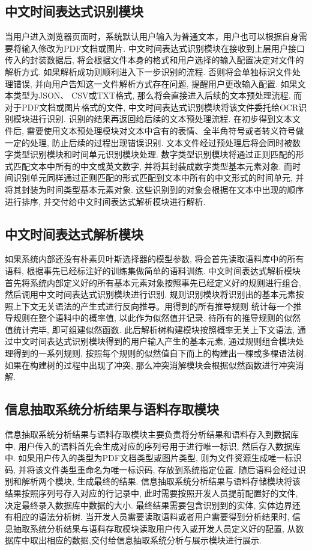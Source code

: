 \subsection{中文时间表达式识别模块}

当用户进入浏览器页面时，系统默认用户输入为普通文本，用户也可以根据自身需要将输入修改为PDF文档或图片.
中文时间表达式识别模块在接收到上层用户接口传入的封装数据后, 将会根据文件本身的格式和用户选择的输入配置决定对文件的解析方式. 如果解析成功则顺利进入下一步识别的流程.
否则将会单独标识文件处理错误, 并向用户告知这一文件解析方式存在问题, 提醒用户更改输入配置.
如果文本类型为JSON、 CSV或TXT格式, 那么将会直接进入后续的文本预处理流程.
而对于PDF文档或图片格式的文件, 中文时间表达式识别模块将该文件委托给OCR识别模块进行识别. 识别的结果再返回给后续的文本预处理流程.
在初步得到文本文件后, 需要使用文本预处理模块对文本中含有的表情、全半角符号或者转义符号做一定的处理, 防止后续的过程出现错误识别.
文本文件经过预处理后将会同时被数字类型识别模块和时间单元识别模块处理.
数字类型识别模块将通过正则匹配的形式匹配文本中所有的中文或英文数字, 并将其封装成数字类型基本元素对象.
而时间识别单元同样通过正则匹配的形式匹配到文本中所有的中文形式的时间单元, 并将其封装为时间类型基本元素对象.
这些识别到的对象会根据在文本中出现的顺序进行排序, 并交付给中文时间表达式解析模块进行解析.

\subsection{中文时间表达式解析模块}

如果系统内部还没有朴素贝叶斯选择器的模型参数, 将会首先读取语料库中的所有语料, 根据事先已经标注好的训练集做简单的语料训练.
中文时间表达式解析模块首先将系统内部定义好的所有基本元素对象按照事先已经定义好的规则进行组合, 然后调用中文时间表达式识别模块进行识别.
规则识别模块将识别出的基本元素按照上下文无关语法的产生式进行反向推导。用得到的所有推导规则
统计每一个推导规则在整个语料中的概率值, 以此作为似然值并记录. 待所有的推导规则的似然值统计完毕, 即可组建似然函数.
此后解析树构建模块按照概率无关上下文语法, 通过中文时间表达式识别模块得到的用户输入产生的基本元素, 通过规则组合模块处理得到的一系列规则,
按照每个规则的似然值自下而上的构建出一棵或多棵语法树.
如果在构建树的过程中出现了冲突, 那么冲突消解模块会根据似然函数进行冲突消解.

\subsection{信息抽取系统分析结果与语料存取模块}

信息抽取系统分析结果与语料存取模块主要负责将分析结果和语料存入到数据库中.
用户传入的语料首先会生成对应的序列号用于进行唯一标识, 然后存入数据库中.
如果用户传入的类型为PDF文档类型或图片类型, 则为文件资源生成唯一标识码, 并将该文件类型重命名为唯一标识码, 存放到系统指定位置.
随后语料会经过识别和解析两个模块, 生成最终的结果.
信息抽取系统分析结果与语料存储模块将该结果按照序列号存入对应的行记录中, 此时需要按照开发人员提前配置好的文件, 决定最终录入数据库中数据的大小.
最终结果需要包含识别到的实体, 实体边界还有相应的语法分析树.
当开发人员需要读取语料或者用户需要得到分析结果时, 信息抽取系统分析结果与语料存取模块读取用户传入或开发人员定义好的配置, 从数据库中取出相应的数据,交付给信息抽取系统分析与展示模块进行展示.

